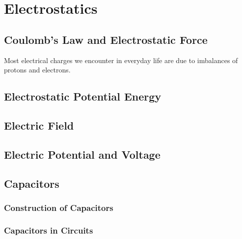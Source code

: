 \chapter{Electrostatics} \label{chap:Electrostatics}
	\section{Coulomb's Law and Electrostatic Force}  
	Most electrical charges we encounter in everyday life are due to imbalances of protons and electrons.  
	\section{Electrostatic Potential Energy}
	\section{Electric Field}
	\section{Electric Potential and Voltage}
	\section{Capacitors}
		\subsection{Construction of Capacitors}
		\subsection{Capacitors in Circuits}
		
	
	
	

	


